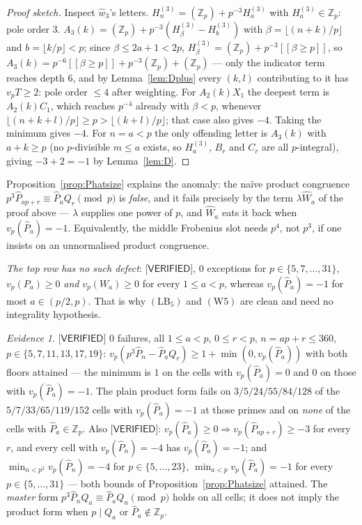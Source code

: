 \documentclass[11pt,reqno]{amsart}
\theoremstyle{plain}
\theoremstyle{definition}
\theoremstyle{remark}
\newtheorem{evidence}[theorem]{Evidence}
\numberwithin{equation}{section}
\newcommand{\ZZ}{\mathbb{Z}}
\newcommand{\Zp}{\ZZ_p}
\newcommand{\ii}[1]{[\![#1]\!]}
\newcommand{\wthree}{\hat w_3}
\newcommand{\VERIFIED}{\textsf{[VERIFIED]}}
\begin{document}
\begin{proof}[Proof sketch]
Inspect $\wthree$'s letters. $H^{(3)}_n=(\Zp)+p^{-3}H^{(3)}_a$ with $H^{(3)}_a\in\Zp$: pole
order $3$. $A_3(k)=(\Zp)+p^{-3}(H^{(3)}_\beta-H^{(3)}_b)$ with $\beta=\lfloor(n+k)/p\rfloor$ and
$b=\lfloor k/p\rfloor<p$; since $\beta\le2a+1<2p$, $H^{(3)}_\beta=(\Zp)+p^{-3}\ii{\beta\ge p}$,
so $A_3(k)=p^{-6}\ii{\beta\ge p}+p^{-3}(\Zp)+(\Zp)$ --- only the indicator term reaches depth
$6$, and by Lemma~\ref{lem:Dplus} every $(k,l)$ contributing to it has $v_pT\ge2$: pole order
$\le4$ after weighting. For $A_2(k)X_1$ the deepest term is $A_2(k)C_1$, which reaches $p^{-4}$
already with $\beta<p$, whenever $\lfloor(n+k+l)/p\rfloor\ge p>\lfloor(k+l)/p\rfloor$; that case
also gives $-4$. Taking the minimum gives $-4$. For $n=a<p$ the only offending letter is
$A_3(k)$ with $a+k\ge p$ (no $p$-divisible $m\le a$ exists, so $H^{(3)}_a$, $B_r$ and $C_r$ are
all $p$-integral), giving $-3+2=-1$ by Lemma~\ref{lem:D}.
\end{proof}

Proposition~\ref{prop:Phatsize} explains the anomaly: the na\"ive product congruence
$p^3\hat P_{ap+r}\equiv\hat P_aQ_r\pmod p$ is \emph{false}, and it fails precisely by the term
$\lambda\hat W_a$ of the proof above --- $\lambda$ supplies one power of $p$,
and $\hat W_a$ eats it back when $v_p(\hat P_a)=-1$. Equivalently, the middle Frobenius slot
needs $p^4$, not $p^3$, if one insists on an unnormalised product congruence.

\emph{The top row has no such defect}: $\VERIFIED$, $0$ exceptions for
$p\in\{5,7,\dots,31\}$, $v_p(P_a)\ge0$ \emph{and} $v_p(W_a)\ge0$ for every $1\le a<p$, whereas
$v_p(\hat P_a)=-1$ for most $a\in(p/2,p)$. That is why $(\mathrm{LB}_5)$ and $(\mathrm W5)$ are
clean and need no integrality hypothesis.

\begin{evidence}\label{ev:middle}
$\VERIFIED$ $0$ failures, all $1\le a<p$, $0\le r<p$, $n=ap+r\le360$,
$p\in\{5,7,11,13,17,19\}$: $v_p(p^3\hat P_n-\hat P_aQ_r)\ge1+\min(0,v_p(\hat P_a))$ with both
floors attained --- the minimum is $1$ on the cells with $v_p(\hat P_a)=0$ and $0$ on those with
$v_p(\hat P_a)=-1$. The plain product form fails on $3/5/24/55/84/128$ of the
$5/7/33/65/119/152$ cells with $v_p(\hat P_a)=-1$ at those primes and on \emph{none} of the
cells with $\hat P_a\in\Zp$. Also $\VERIFIED$: $v_p(\hat P_a)\ge0\Rightarrow v_p(\hat P_{ap+r})\ge-3$
for every $r$, and every cell with $v_p(\hat P_n)=-4$ has $v_p(\hat P_a)=-1$; and
$\min_{n<p^2}v_p(\hat P_n)=-4$ for $p\in\{5,\dots,23\}$, $\min_{a<p}v_p(\hat P_a)=-1$ for every
$p\in\{5,\dots,31\}$ --- both bounds of Proposition~\ref{prop:Phatsize} attained. The
\emph{master} form $p^3\hat P_nQ_a\equiv\hat P_aQ_n\pmod p$ holds on all cells; it does not
imply the product form when $p\mid Q_a$ or $\hat P_a\notin\Zp$.
\end{evidence}
\end{document}
